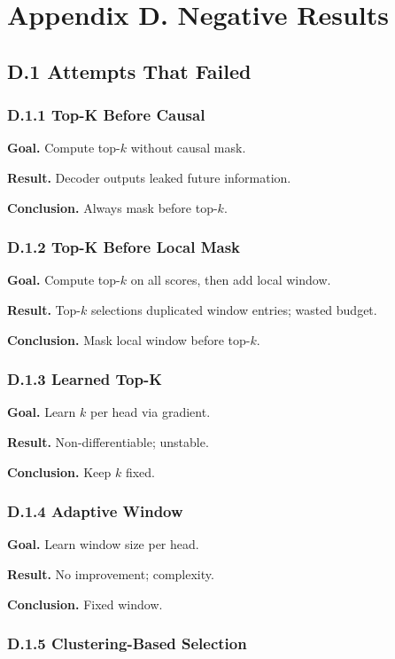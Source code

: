 
\section{Appendix D. Negative Results}

\subsection{D.1 Attempts That Failed}

\subsubsection{D.1.1 Top-K Before Causal}

\textbf{Goal.} Compute top-$k$ without causal mask.

\textbf{Result.} Decoder outputs leaked future information.

\textbf{Conclusion.} Always mask before top-$k$.

\subsubsection{D.1.2 Top-K Before Local Mask}

\textbf{Goal.} Compute top-$k$ on all scores, then add local window.

\textbf{Result.} Top-$k$ selections duplicated window entries; wasted budget.

\textbf{Conclusion.} Mask local window before top-$k$.

\subsubsection{D.1.3 Learned Top-K}

\textbf{Goal.} Learn $k$ per head via gradient.

\textbf{Result.} Non-differentiable; unstable.

\textbf{Conclusion.} Keep $k$ fixed.

\subsubsection{D.1.4 Adaptive Window}

\textbf{Goal.} Learn window size per head.

\textbf{Result.} No improvement; complexity.

\textbf{Conclusion.} Fixed window.

\subsubsection{D.1.5 Clustering-Based Selection}

